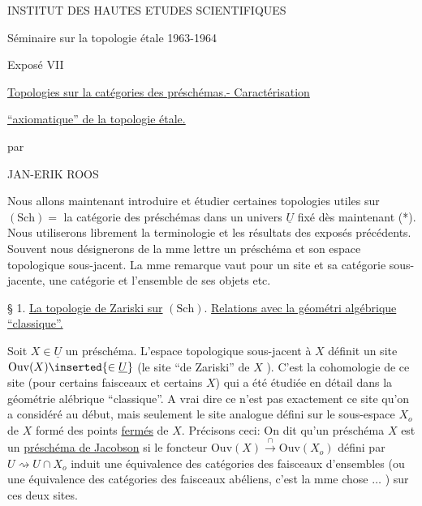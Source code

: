 \begin{center}
INSTITUT DES HAUTES ETUDES SCIENTIFIQUES

Séminaire sur la topologie étale 1963-1964

Exposé VII

\uline{Topologies sur la catégories des préschémas.- Caractérisation}

\uline{``axiomatique'' de la topologie étale.}

par

JAN-ERIK ROOS
\end{center}

Nous allons maintenant introduire et étudier certaines topologies utiles sur $(\mathrm{Sch})=$ la catégorie des préschémas dans un univers $\underline{U}$ fixé dès maintenant (*). Nous utiliserons librement la terminologie et les résultats des exposés précédents. Souvent nous désignerons de la mme lettre un préschéma et son espace topologique sous-jacent. La mme remarque vaut pour un site et sa catégorie sous-jacente, une catégorie et l'ensemble de ses objets etc.

§ 1. \uline{La topologie de Zariski sur} $(\mathrm{Sch})$. \uline{Relations avec la géométri algébrique ``classique''.}

Soit $X\in\underline{U}$ un préschéma. L'espace topologique sous-jacent à $X$ définit un site $\mathrm{Ouv}(X)\inserted{\in\underline{U}}$ (le site ``de Zariski'' de $X$ ). C'est la cohomologie de ce site (pour certains faisceaux et certains $X$) qui a été étudiée en détail dans la géométrie alébrique ``classique''. A vrai dire ce n'est pas exactement ce site qu'on a considéré au début, mais seulement le site analogue défini sur le sous-espace $X_o$ de $X$ formé des points \uline{fermés} de $X$. Précisons ceci: On dit qu'un préschéma $X$ est un \uline{préschéma de Jacobson} si le foncteur $\mathrm{Ouv}(X)\xrightarrow{\cap}\mathrm{Ouv}(X_o)$ défini par $U\rightsquigarrow U\cap X_o$ induit une équivalence des catégories des faisceaux d'ensembles (ou une équivalence des catégories des faisceaux abéliens, c'est la mme chose $\ldots$ ) sur ces deux sites.

